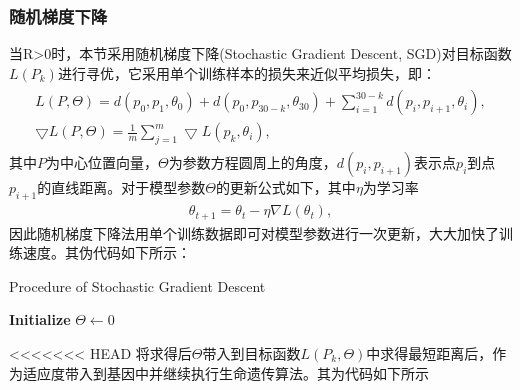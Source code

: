 \documentclass{whutmod}
\begin{document}
\begin{table}[H]
\begin{tablenotes}
	\subsubsection{随机梯度下降}	
    	 当R>0时，本节采用随机梯度下降(Stochastic Gradient Descent, SGD)对目标函数$L(P_k)$进行寻优，它采用单个训练样本的损失来近似平均损失，即：
    	 	    \begin{gather}
    	 \begin{matrix}
    	 L(P,\Theta)=d(p_0,p_{1},\theta_0)+d(p_0,p_{30-k},\theta_{30})+\sum_{i=1}^{30-k}d(p_i,p_{i+1},\theta_{i}) ,\\ 
    	 \bigtriangledown  L(P,\Theta)= \frac{1}{m}\sum_{j=1}^{m}\bigtriangledown L(p_k,\theta_{i}),
    	 \end{matrix}
    	 \end{gather}
    	 其中$P$为中心位置向量，$\Theta$为参数方程圆周上的角度，$d(p_i,p_{i+1})$表示点$p_i$到点$p_{i+1}$的直线距离。对于模型参数$\Theta$的更新公式如下，其中$\eta$为学习率
    	 \begin{gather}
			\theta_{t+1}=\theta_{t}-\eta \nabla L\left(\theta_{t}\right),
    	 \end{gather}
    	 因此随机梯度下降法用单个训练数据即可对模型参数进行一次更新，大大加快了训练速度。其伪代码如下所示：
    	 
    	   	\begin{algorithm}[H]
    	 	\caption{Procedure of Stochastic Gradient Descent}
    	 	\LinesNumbered
    	 	\textbf{Initialize} $\Theta \leftarrow 0$ \newline
    	 	\Return {$\Theta$ }
    	 \end{algorithm}
		
<<<<<<< HEAD
		将求得后$\Theta$带入到目标函数$L(P_k, \Theta)$中求得最短距离后，作为适应度带入到基因中并继续执行生命遗传算法。其为代码如下所示
		

\end{tablenotes}
\end{table}
\end{document}
